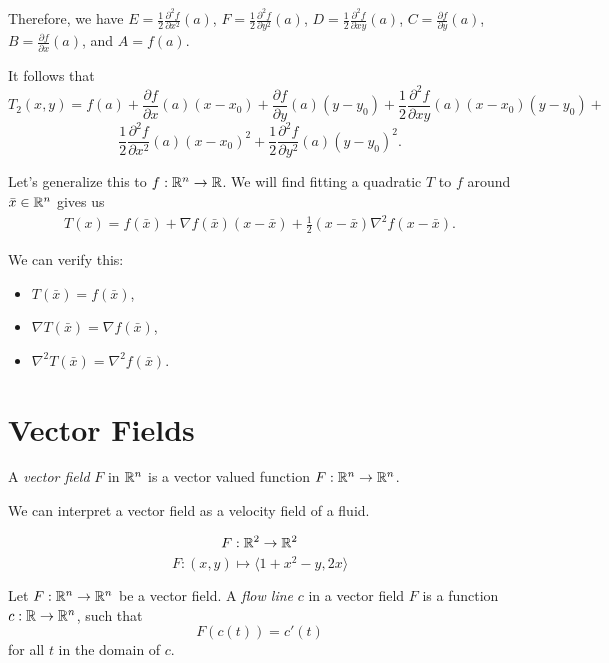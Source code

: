 Therefore, we have $E = \frac{1}{2}\frac{\partial^2 f}{\partial x^2}(a)$, $F = \frac{1}{2}\frac{\partial^2 f}{\partial y^2}(a)$, $D = \frac{1}{2}\frac{\partial^2 f}{\partial xy}(a)$, $C = \frac{\partial f}{\partial y}(a)$, $B = \frac{\partial f}{\partial x}(a)$, and $A = f(a)$.

It follows that \[T_2(x, y) = f(a) + \frac{\partial f}{\partial x}(a)(x-x_0) + \frac{\partial f}{\partial y}(a)(y-y_0) + \frac{1}{2}\frac{\partial^2 f}{\partial xy}(a)(x-x_0)(y-y_0) + \]
\[\frac{1}{2}\frac{\partial^2 f}{\partial x^2}(a)(x-x_0)^2 + \frac{1}{2}\frac{\partial^2 f}{\partial y^2}(a)(y-y_0)^2.\]

Let's generalize this to $f: \mathbb{R}^n \to \mathbb{R}$. We will find fitting a quadratic $T$ to $f$ around $\bar{x} \in \mathbb{R}^n$ gives us
\begin{align*}
    T(x) = f(\bar{x}) + \nabla f(\bar{x})\left(x-\bar{x}\right) + \frac{1}{2}\left(x-\bar{x}\right)\nabla^2f\left(x - \bar{x}\right).
\end{align*}

We can verify this:
\begin{itemize}
    \item $T(\bar{x}) = f(\bar{x})$,
    \item $\nabla T(\bar{x}) = \nabla f(\bar{x})$,
    \item $\nabla^2 T(\bar{x}) = \nabla^2 f(\bar{x})$.
\end{itemize}

\section{Vector Fields}

\begin{defn}
    A \emph{vector field} $F$ in $\mathbb{R}^n$ is a vector valued function $F: \mathbb{R}^n \to \mathbb{R}^n$.
\end{defn}

\begin{rmk}
    We can interpret a vector field as a velocity field of a fluid.
\end{rmk}

\begin{exmp}
    \[F: \mathbb{R}^2 \to \mathbb{R}^2\]
    \[F: (x, y) \mapsto \langle 1 + x^2 - y, 2x\rangle \]
\end{exmp}

\begin{defn}
    Let $F: \mathbb{R}^n \to \mathbb{R}^n$ be a vector field. A \emph{flow line} $c$ in a vector field $F$ is a function $c: \mathbb{R} \to \mathbb{R}^n$, such that \[F(c(t)) = c'(t)\] for all $t$ in the domain of $c$.
\end{defn}

